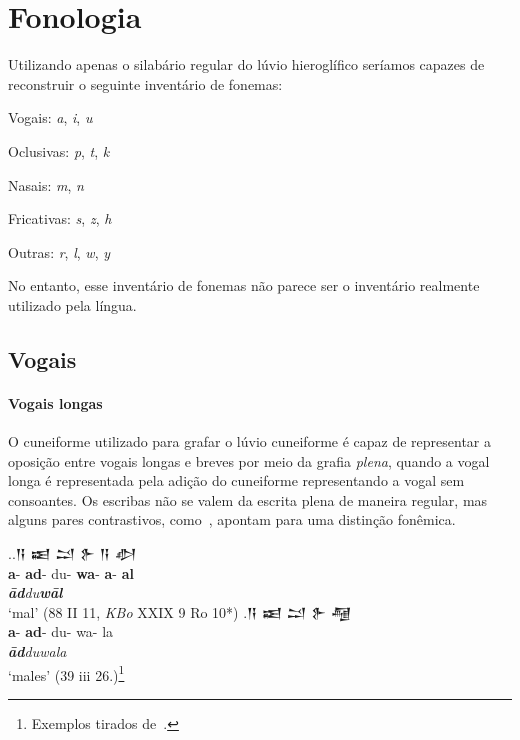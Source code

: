 \section{Fonologia}

Utilizando apenas o silabário regular do lúvio hieroglífico seríamos capazes de
reconstruir o seguinte inventário de fonemas:

\begin{compactitem}
	\item Vogais: \emph{a}, \emph{i}, \emph{u}
	\item Oclusivas: \emph{p}, \emph{t}, \emph{k}
	\item Nasais: \emph{m}, \emph{n}
	\item Fricativas: \emph{s}, \emph{z}, \emph{h}
	\item Outras: \emph{r}, \emph{l}, \emph{w}, \emph{y}
\end{compactitem}
No entanto, esse inventário de fonemas não parece ser o inventário realmente
utilizado pela língua.

\subsection{Vogais}

\paragraph{Vogais longas}
O cuneiforme utilizado para grafar o lúvio cuneiforme é capaz de representar
a oposição entre vogais longas e
breves por meio da grafia \emph{plena}, quando a vogal longa é representada pela
adição do cuneiforme representando a vogal sem consoantes.
Os escribas não se valem da escrita plena de maneira regular, mas alguns pares
contrastivos, como~\Next, apontam para uma distinção fonêmica.

\ex.\ag.\foreignlanguage{hittite}{𒀀} \foreignlanguage{hittite}{𒀜}
\foreignlanguage{hittite}{𒁺}  \foreignlanguage{hittite}{𒉿}
\foreignlanguage{hittite}{𒀀}  \foreignlanguage{hittite}{𒀠}\\
\textbf{a}- \textbf{ad}- du- \textbf{wa}- \textbf{a}- \textbf{al}\\
\emph{\textbf{ād}du\textbf{wāl}}\\
`mal' (88 II 11, \emph{KBo} XXIX 9 Ro 10*)
\bg.\foreignlanguage{hittite}{𒀀} \foreignlanguage{hittite}{𒀜}
\foreignlanguage{hittite}{𒁺}  \foreignlanguage{hittite}{𒉿}
\foreignlanguage{hittite}{𒆷}\\
\textbf{a}- \textbf{ad}- du- wa- la\\
\emph{\textbf{ād}duwala}\\
`males' (39 iii 26.)\footnote{Exemplos tirados de~\citet{Melchert1993}.}

